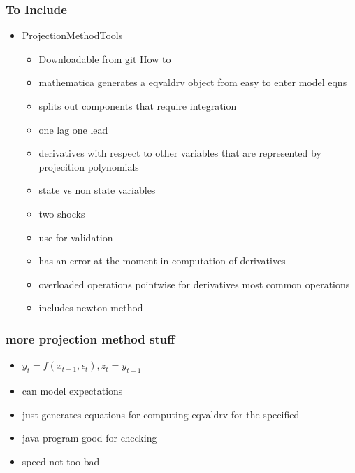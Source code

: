 \documentclass[handout]{beamer}
\begin{document}
\begin{frame}
  \frametitle{To Include}
  \begin{itemize}
  \item ProjectionMethodTools
    \begin{itemize}
    \item Downloadable from git  How to
    \item mathematica generates a eqvaldrv object from easy to enter model eqns
    \item splits out components that require integration
    \item one lag one lead
    \item derivatives with respect to other variables that are represented by projecition polynomials
    \item state vs non state variables
    \item two shocks
    \item use for validation
    \item has an error at the moment in computation of derivatives
    \item overloaded operations pointwise for derivatives most common operations
    \item includes newton method
    \end{itemize}

  \end{itemize}
\end{frame}

\begin{frame}
  \frametitle{more projection method stuff}
  \begin{itemize}
\item $y_{t}=f(x_{t-1},\epsilon_t),z_t=y_{t+1}$
  \item can model expectations
  \item just generates equations for computing eqvaldrv for the specified
  \item java program good for checking
  \item speed not too bad
  \end{itemize}
\end{frame}
\end{document}
